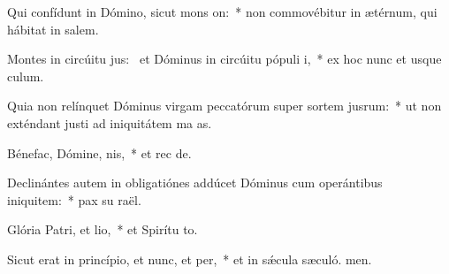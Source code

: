 \item Qui confídunt in Dómino, sicut mons on:~* non commovébitur in ætérnum, qui hábitat in salem.
\item Montes in circúitu jus:~\pscross{} et Dóminus in circúitu pópuli i,~* ex hoc nunc et usque  culum.
\item Quia non relínquet Dóminus virgam peccatórum super sortem jusrum:~* ut non exténdant justi ad iniquitátem ma as.
\item Bénefac, Dómine, nis,~* et rec de.
\item Declinántes autem in obligatiónes addúcet Dóminus cum operántibus iniquitem:~* pax su raël.
\item Glória Patri, et lio,~* et Spirítu to.
\item Sicut erat in princípio, et nunc, et per,~* et in sǽcula sæculó. men.
